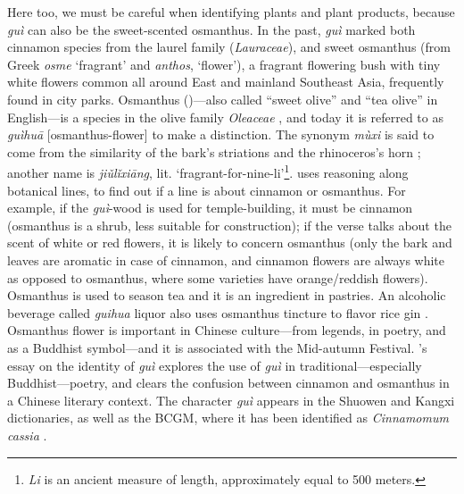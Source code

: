 Here too, we must be careful when identifying plants and plant products, because \textit{guì} can also be the sweet-scented osmanthus. In the past, \textit{guì} marked both cinnamon species from the laurel family (\textit{Lauraceae}), and sweet osmanthus (from Greek \textit{osme} `fragrant' and \textit{anthos}, `flower'), a fragrant flowering bush with tiny white flowers common all around East and mainland Southeast Asia, frequently found in city parks. Osmanthus ()---also called ``sweet olive'' and ``tea olive'' in English---is a species in the olive family \textit{Oleaceae} \parencite[191]{pearlstine_scent_2022}, and today it is referred to as  \textit{guìhuā} [osmanthus-flower] to make a distinction. The synonym  \textit{mùxi} is said to come from the similarity of the bark's striations and the rhinoceros's horn \parencite{chennault_reclusive_2006}; another name is  \textit{jiǔlǐxiāng}, lit. `fragrant-for-nine-li'\footnote{\textit{Li} is an ancient measure of length, approximately equal to 500 meters.}. \textcite{chennault_reclusive_2006} uses reasoning along botanical lines, to find out if a line is about cinnamon or osmanthus. For example, if the \textit{guì}-wood is used for temple-building, it must be cinnamon (osmanthus is a shrub, less suitable for construction); if the verse talks about the scent of white or red flowers, it is likely to concern osmanthus (only the bark and leaves are aromatic in case of cinnamon, and cinnamon flowers are always white as opposed to osmanthus, where some varieties have orange/reddish flowers). Osmanthus is used to season tea and it is an ingredient in pastries. An alcoholic beverage called \textit{guihua} liquor also uses osmanthus tincture to flavor rice gin \parencite[627]{hu_food_2005}. Osmanthus flower is important in Chinese culture---from legends, in poetry, and as a Buddhist symbol---and it is associated with the Mid-autumn Festival. \textcite{chennault_reclusive_2006}'s essay on the identity of \textit{guì} explores the use of \textit{guì} in traditional---especially Buddhist---poetry, and clears the confusion between cinnamon and osmanthus in a Chinese literary context. The character  \textit{guì} appears in the \gls{Shuowen} and \gls{Kangxi} dictionaries, as well as the \gls{BCGM}, where it has been identified as \textit{Cinnamomum cassia} \parencite[732]{zhang_dictionary_2015}.


